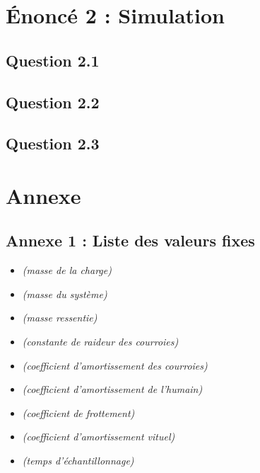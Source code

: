 \documentclass[a4paper,12pt]{article}
\begin{document}
    \newpage
    \section{Énoncé 2 : Simulation}
    \subsection{Question 2.1}
    
    \subsection{Question 2.2}
    
    \subsection{Question 2.3}
    
    
    
    \newpage
    \section{Annexe}
    \subsection{Annexe 1 : Liste des valeurs fixes} \label{Annexe:ValList}
    \begin{itemize}
        \item[]  \textit{(masse de la charge)}
        \item[]  \textit{(masse du système)}
        \item[]  \textit{(masse ressentie)}
        \item[]  \textit{(constante de raideur des courroies)}
        \item[]  \textit{(coefficient d'amortissement des courroies)}
        \item[]  \textit{(coefficient d'amortissement de l'humain)}
        \item[]  \textit{(coefficient de frottement)}
        \item[]  \textit{(coefficient d'amortissement vituel)}
        \item[]  \textit{(temps d'échantillonnage)}
    \end{itemize}
\end{document}
